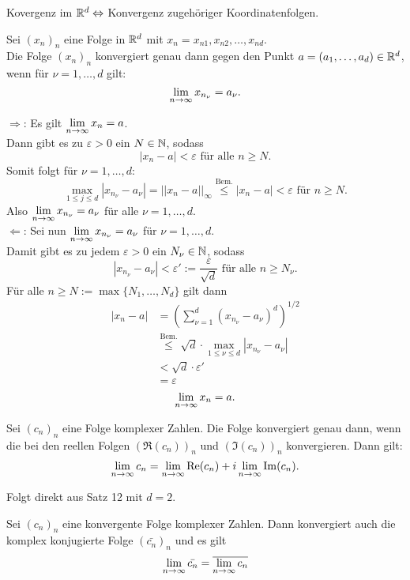 \documentclass[../ana1.tex]{subfiles}
\begin{document}
Kovergenz im \(\mathbb{R}^d \Leftrightarrow \) Konvergenz zugehöriger Koordinatenfolgen.
\begin{satz}
	Sei \({(x_n)}_n\) eine Folge in \(\mathbb{R}^d\) mit \(x_n = x_{n1},x_{n2},\dots,x_{nd}\).\\
	Die Folge \({(x_n)}_n\) konvergiert genau dann gegen den Punkt \(a = (a_1,\dots,a_d)\in\mathbb{R}^d\), wenn für \(\nu = 1,\dots,d\) gilt:
	\[ \lim\limits_{n\rightarrow\infty} x_{n_\nu} = a_\nu. \]
\end{satz}
\begin{bew}
	\glqq{}\(\Rightarrow \)\grqq{}: Es gilt \( \lim\limits_{n\rightarrow\infty}x_n = a \).\\
	Dann gibt es zu \(\varepsilon>0\) ein \(N\in\mathbb{N} \), sodass
	\[ |x_n - a| < \varepsilon \text{ für alle } n\geq N. \]
	Somit folgt für \(\nu = 1,\dots,d\):
	\[ \underset{1\leq j\leq d}{\max} |x_{n_\nu} - a_\nu| = ||x_n - a||_\infty \overset{\text{Bem.}}{\leq} |x_n - a| < \varepsilon \text{ für }n\geq N. \]
	Also \(\lim\limits_{n\rightarrow\infty}x_{n_\nu} = a_\nu \) für alle \(\nu = 1,\dots,d\).\\
	\glqq{}\(\Leftarrow \)\grqq: Sei nun \( \lim\limits_{n\rightarrow\infty}x_{n_\nu} = a_\nu \) für \(\nu = 1,\dots,d\).\\
	Damit gibt es zu jedem \(\varepsilon>0\) ein \(N_\nu \in\mathbb{N} \), sodass
	\[ |x_{n_\nu} - a_\nu| < \varepsilon' := \frac{\varepsilon}{\sqrt{d}} \text{ für alle } n\geq N_\nu. \]
	Für alle \(n\geq N := \max \{N_1,\dots,N_d\} \) gilt dann
	\begin{align*}
		|x_n - a| &= {\left( \sum_{\nu=1}^{d} {(x_{n_\nu} - a_\nu)}^d \right)}^{1/2}\\
		&\overset{\text{Bem.}}{\leq} \sqrt{d} \cdot \underset{1\leq \nu\leq d}{\max} |x_{n_\nu} -a_\nu|\\
		&< \sqrt{d} \cdot \varepsilon'\\
		&= \varepsilon
	\end{align*}
	\[ \lim\limits_{n\rightarrow\infty} x_n = a. \]
\end{bew}
\begin{kor}
	Sei \({(c_n)}_n\) eine Folge komplexer Zahlen. Die Folge konvergiert genau dann, wenn die bei den reellen Folgen \({(\Re(c_n))}_n\) und \( {(\Im(c_n))}_n \) konvergieren. Dann gilt:
	\[ \lim\limits_{n\rightarrow\infty} c_n = \lim\limits_{n\rightarrow\infty} \operatorname{{Re}}(c_n) + i \lim\limits_{n\rightarrow\infty} \operatorname{Im}(c_n). \]
\end{kor}
\begin{bew}
	Folgt direkt aus Satz 12 mit \(d=2\).
\end{bew}
\begin{kor}
	Sei \({(c_n)}_n\) eine konvergente Folge komplexer Zahlen. Dann konvergiert auch die komplex konjugierte Folge \({(\bar{c_n})}_n\) und es gilt
	\[ \lim\limits_{n\rightarrow\infty} \bar{c_n} = \overline{ \lim\limits_{n\rightarrow\infty}c_n } \]
\end{kor}
\end{document}
